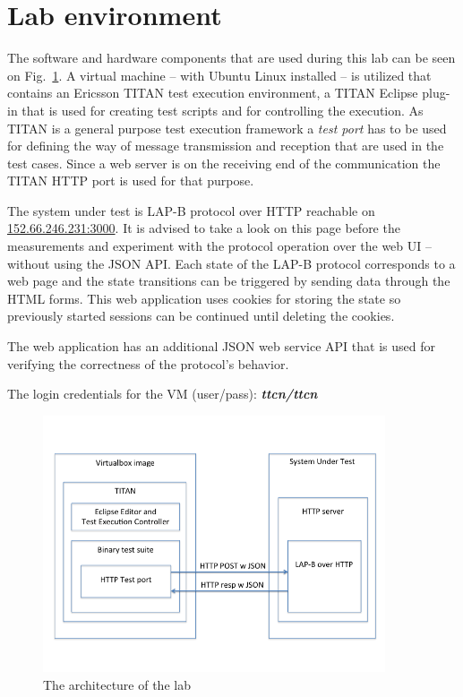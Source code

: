 \documentclass[a4paper]{article}
\begin{document}
\section{Lab environment}

The software and hardware components that are used during this lab can be seen on Fig.~\ref{fig:lab-arch}.
A virtual machine -- with Ubuntu Linux installed -- is utilized that contains an Ericsson TITAN test execution environment,
a TITAN Eclipse plug-in that is used for creating test scripts and for controlling the execution. As TITAN is a general
purpose test execution framework a \emph{test port} has to be used for defining the way of message transmission and
reception that are used in the test cases. Since a web server is on the receiving end of the communication the TITAN
HTTP port is used for that purpose.

The system under test is LAP-B protocol over HTTP reachable on \url{152.66.246.231:3000}. It is advised to take a look
on this page before the measurements and experiment with the protocol operation over the web UI -- without using the
JSON API.
Each state of the LAP-B protocol corresponds to a web page and the state transitions can be triggered by sending data
through the HTML forms.
This web application uses cookies for storing the state so previously started sessions can be continued until deleting
the cookies.

The web application has an additional JSON web service API that is used for verifying the correctness of the protocol's
behavior.

The login credentials for the VM (user/pass): \textbf{\emph{ttcn/ttcn}}

\begin{figure}[!htb]
    \centering
    \includegraphics[width=0.9\textwidth]{figures/lab-arch.png}
    \caption{The architecture of the lab}
    \label{fig:lab-arch}
\end{figure}
\end{document}
